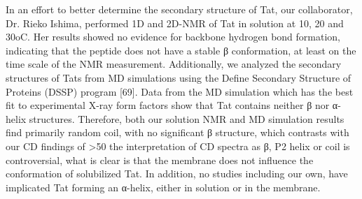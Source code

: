 In an effort to better determine the secondary structure of Tat, our collaborator, Dr.
Rieko Ishima, performed 1D and 2D-NMR of Tat in solution at 10, 20 and 30oC. Her results
showed no evidence for backbone hydrogen bond formation, indicating that the peptide does not
have a stable β conformation, at least on the time scale of the NMR measurement. Additionally,
we analyzed the secondary structures of Tats from MD simulations using the Define Secondary
Structure of Proteins (DSSP) program [69]. Data from the MD simulation which has the best fit
to experimental X-ray form factors show that Tat contains neither β nor α-helix structures.
Therefore, both our solution NMR and MD simulation results find primarily random coil, with
no significant β structure, which contrasts with our CD findings of >50%
the interpretation of CD spectra as β, P2 helix or coil is controversial, what is clear is that the
membrane does not influence the conformation of solubilized Tat. In addition, no studies
including our own, have implicated Tat forming an α-helix, either in solution or in the
membrane.

